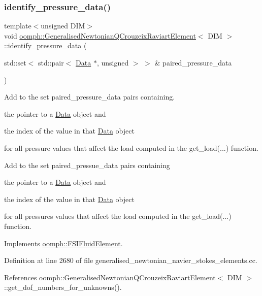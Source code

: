 \subsubsection{\texorpdfstring{identify\+\_\+pressure\+\_\+data()}{identify\_pressure\_data()}}
{\footnotesize\ttfamily template$<$unsigned D\+IM$>$ \\
void \hyperlink{classoomph_1_1GeneralisedNewtonianQCrouzeixRaviartElement}{oomph\+::\+Generalised\+Newtonian\+Q\+Crouzeix\+Raviart\+Element}$<$ D\+IM $>$\+::identify\+\_\+pressure\+\_\+data (\begin{DoxyParamCaption}\item[{std\+::set$<$ std\+::pair$<$ \hyperlink{classoomph_1_1Data}{Data} $\ast$, unsigned $>$ $>$ \&}]{paired\+\_\+pressure\+\_\+data }\end{DoxyParamCaption})\hspace{0.3cm}{\ttfamily [virtual]}}



Add to the set {\ttfamily paired\+\_\+pressure\+\_\+data} pairs containing. 


\begin{DoxyItemize}
\item the pointer to a \hyperlink{classoomph_1_1Data}{Data} object and
\item the index of the value in that \hyperlink{classoomph_1_1Data}{Data} object
\end{DoxyItemize}for all pressure values that affect the load computed in the {\ttfamily get\+\_\+load}(...) function.

Add to the set {\ttfamily paired\+\_\+pressue\+\_\+data} pairs containing
\begin{DoxyItemize}
\item the pointer to a \hyperlink{classoomph_1_1Data}{Data} object and
\item the index of the value in that \hyperlink{classoomph_1_1Data}{Data} object
\end{DoxyItemize}for all pressures values that affect the load computed in the {\ttfamily get\+\_\+load}(...) function. 

Implements \hyperlink{classoomph_1_1FSIFluidElement_af8e0805b769b7d111eb71f223fc83df8}{oomph\+::\+F\+S\+I\+Fluid\+Element}.



Definition at line 2680 of file generalised\+\_\+newtonian\+\_\+navier\+\_\+stokes\+\_\+elements.\+cc.



References oomph\+::\+Generalised\+Newtonian\+Q\+Crouzeix\+Raviart\+Element$<$ D\+I\+M $>$\+::get\+\_\+dof\+\_\+numbers\+\_\+for\+\_\+unknowns().



